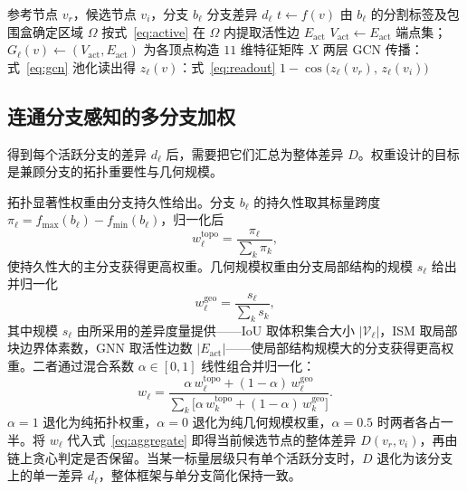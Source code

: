 \documentclass[twocolumn, a4paper, 10pt]{article}
\begin{document}
\begin{algorithm}[H]
\caption{\textsc{BranchDiff} 的 GNN 实例}
\label{alg:gnn}
\begin{algorithmic}[1]
\Require 参考节点 $v_r$，候选节点 $v_i$，分支 $b_\ell$
\Ensure 分支差异 $d_\ell$
    \State $t \gets f(v)$
    \State 由 $b_\ell$ 的分割标签及包围盒确定区域 $\Omega$
    \State 按式~\eqref{eq:active} 在 $\Omega$ 内提取活性边 $E_{\mathrm{act}}$
    \State $V_{\mathrm{act}} \gets E_{\mathrm{act}}$ 端点集；\ $G_\ell(v)\!\gets\!(V_{\mathrm{act}},E_{\mathrm{act}})$
    \State 为各顶点构造 $11$ 维特征矩阵 $X$
    \State 两层 GCN 传播：式~\eqref{eq:gcn}
    \State 池化读出得 $z_\ell(v)$：式~\eqref{eq:readout}
  \EndFor
  \State \Return $1-\cos\bigl(z_\ell(v_r),\,z_\ell(v_i)\bigr)$
\EndFunction
\end{algorithmic}
\end{algorithm}

\subsection{连通分支感知的多分支加权}
\label{sec:weight}

得到每个活跃分支的差异 $d_\ell$ 后，需要把它们汇总为整体差异 $D$。权重设计的目标是兼顾分支的拓扑重要性与几何规模。

拓扑显著性权重由分支持久性给出。分支 $b_\ell$ 的持久性取其标量跨度 $\pi_\ell=f_{\max}(b_\ell)-f_{\min}(b_\ell)$，归一化后
\begin{equation}
w^{\mathrm{topo}}_\ell=\frac{\pi_\ell}{\sum_{k}\pi_k},
\label{eq:wtopo}
\end{equation}
使持久性大的主分支获得更高权重。几何规模权重由分支局部结构的规模 $s_\ell$ 给出并归一化
\begin{equation}
w^{\mathrm{geo}}_\ell=\frac{s_\ell}{\sum_{k}s_k},
\label{eq:wgeo}
\end{equation}
其中规模 $s_\ell$ 由所采用的差异度量提供——IoU 取体积集合大小 $|\mathcal{V}_\ell|$，ISM 取局部块边界体素数，GNN 取活性边数 $|E_{\mathrm{act}}|$——使局部结构规模大的分支获得更高权重。二者通过混合系数 $\alpha\in[0,1]$ 线性组合并归一化：
\begin{equation}
w_\ell=\frac{\alpha\,w^{\mathrm{topo}}_\ell+(1-\alpha)\,w^{\mathrm{geo}}_\ell}
{\sum_{k}\bigl[\alpha\,w^{\mathrm{topo}}_k+(1-\alpha)\,w^{\mathrm{geo}}_k\bigr]}.
\label{eq:wmix}
\end{equation}
$\alpha=1$ 退化为纯拓扑权重，$\alpha=0$ 退化为纯几何规模权重，$\alpha=0.5$ 时两者各占一半。将 $w_\ell$ 代入式~\eqref{eq:aggregate} 即得当前候选节点的整体差异 $D(v_r,v_i)$，再由链上贪心判定是否保留。当某一标量层级只有单个活跃分支时，$D$ 退化为该分支上的单一差异 $d_\ell$，整体框架与单分支简化保持一致。
\end{document}
